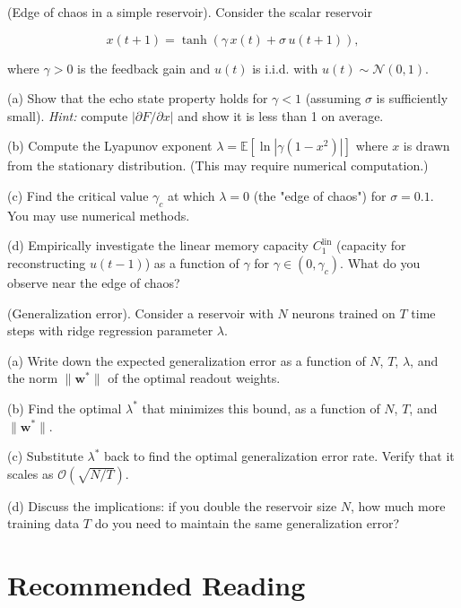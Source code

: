 \begin{exercise}
(Edge of chaos in a simple reservoir). Consider the scalar reservoir

\[
x(t+1) = \tanh(\gamma\, x(t) + \sigma\, u(t+1)),
\]

where $\gamma > 0$ is the feedback gain and $u(t)$ is i.i.d. with $u(t) \sim \mathcal{N}(0, 1)$.

(a) Show that the echo state property holds for $\gamma < 1$ (assuming $\sigma$ is
sufficiently small). \textit{Hint:} compute $|\partial F / \partial x|$ and show it is less
than 1 on average.

(b) Compute the Lyapunov exponent $\lambda = \mathbb{E}[\ln |\gamma (1 - x^2)|]$ where
$x$ is drawn from the stationary distribution. (This may require numerical computation.)

(c) Find the critical value $\gamma_c$ at which $\lambda = 0$ (the "edge of chaos")
for $\sigma = 0.1$. You may use numerical methods.

(d) Empirically investigate the linear memory capacity $C_1^{\text{lin}}$
(capacity for reconstructing $u(t-1)$) as a function of $\gamma$ for $\gamma \in (0, \gamma_c)$.
What do you observe near the edge of chaos?
\end{exercise}


\begin{exercise}
(Generalization error). Consider a reservoir with $N$ neurons
trained on $T$ time steps with ridge regression parameter $\lambda$.

(a) Write down the expected generalization error as a function of $N$, $T$, $\lambda$,
and the norm $\|\mathbf{w}^*\|$ of the optimal readout weights.

(b) Find the optimal $\lambda^*$ that minimizes this bound, as a function of $N$, $T$,
and $\|\mathbf{w}^*\|$.

(c) Substitute $\lambda^*$ back to find the optimal generalization error rate. Verify
that it scales as $\mathcal{O}(\sqrt{N/T})$.

(d) Discuss the implications: if you double the reservoir size $N$, how much more
training data $T$ do you need to maintain the same generalization error?


\bigskip

\end{exercise}


\section*{Recommended Reading}

